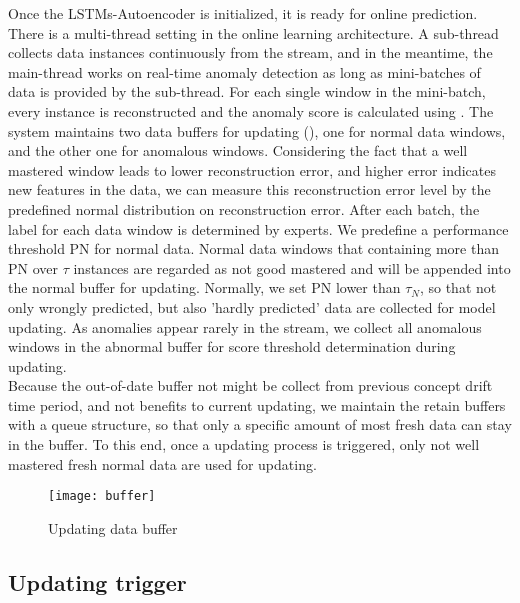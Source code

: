 Once the LSTMs-Autoencoder is initialized, it is ready for online prediction. There is a multi-thread setting in the online learning architecture. A sub-thread collects data instances continuously from the stream, and in the meantime, the main-thread works on real-time anomaly detection as long as mini-batches of data is provided by the sub-thread. For each single window in the mini-batch, every instance is reconstructed and the anomaly score is calculated using . The system maintains two data buffers for updating (), one for normal data windows, and the other one for anomalous windows. Considering the fact that a well mastered window leads to lower reconstruction error, and higher error indicates new features in the data, we can measure this reconstruction error level by the predefined normal distribution on reconstruction error. After each batch, the label for each data window is determined by experts. We predefine a performance threshold PN for normal data. Normal data windows that containing more than PN over $\tau$ instances are regarded as not good mastered and will be appended into the normal buffer for updating. Normally, we set PN lower than $\tau_N$, so that not only wrongly predicted, but also 'hardly predicted' data are collected for model updating. As anomalies appear rarely in the stream, we collect all anomalous windows in the abnormal buffer for score threshold determination during updating. \\ 

Because the out-of-date buffer not might be collect from previous concept drift time period, and not benefits to current updating, we maintain the retain buffers with a queue structure, so that only a specific amount of most fresh data can stay in the buffer. To this end, once a updating process is triggered, only not well mastered fresh normal data are used for updating.


\begin{figure}[h]
\centering
\texttt{[image: buffer]}
\caption[Updating data buffer]{Updating data buffer}
\label{fig:buffer}
\end{figure}


\subsection{Updating trigger}
\label{trigger}

